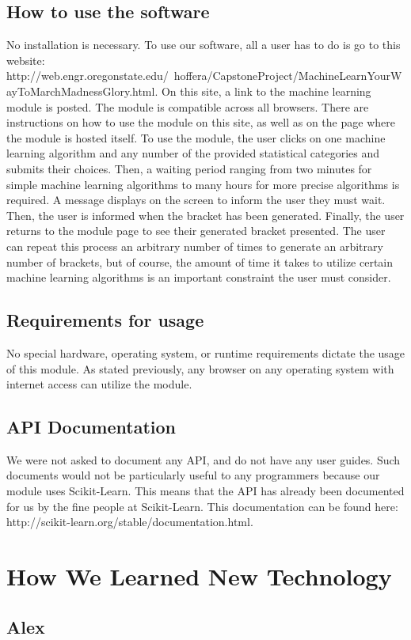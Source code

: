 \documentclass[onecolumn, draftclsnofoot,10pt, compsoc]{IEEEtran}
\begin{document}
\subsection{How to use the software}
No installation is necessary. To use our software, all a user has to do is go to this website: http://web.engr.oregonstate.edu/~hoffera/CapstoneProject/MachineLearnYourWayToMarchMadnessGlory.html. On this site, a link to the machine learning module is posted. The module is compatible across all browsers. There are instructions on how to use the module on this site, as well as on the page where the module is hosted itself. To use the module, the user clicks on one machine learning algorithm and any number of the provided statistical categories and submits their choices. Then, a waiting period ranging from two minutes for simple machine learning algorithms to many hours for more precise algorithms is required. A message displays on the screen to inform the user they must wait. Then, the user is informed when the bracket has been generated. Finally, the user returns to the module page to see their generated bracket presented. The user can repeat this process an arbitrary number of times to generate an arbitrary number of brackets, but of course, the amount of time it takes to utilize certain machine learning algorithms is an important constraint the user must consider.
\subsection{Requirements for usage}
No special hardware, operating system, or runtime requirements dictate the usage of this module. As stated previously, any browser on any operating system with internet access can utilize the module.
\subsection{API Documentation}
We were not asked to document any API, and do not have any user guides. Such documents would not be particularly useful to any programmers because our module uses Scikit-Learn. This means that the API has already been documented for us by the fine people at Scikit-Learn. This documentation can be found here: http://scikit-learn.org/stable/documentation.html.

\section{How We Learned New Technology}
\subsection{Alex}
\end{document}
